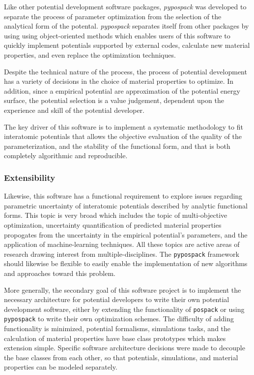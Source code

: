 Like other potential development software packages, \emph{pypospack} was developed to separate the process of parameter optimization from the selection of the analytical form of the potental.  \emph{pypospack} separates itself from other packages by using using object-oriented methods which enables users of this software to quickly implement potentials supported by external codes, calculate new material properties, and even replace the optimization techniques.

Despite the technical nature of the process, the process of potential development has a variety of decisions in the choice of material properties to optimize.  In addition, since a empirical potential are approximation of the potential energy surface, the potential selection is a value judgement, dependent upon the experience and skill of the potential developer.

The key driver of this software is to implement a systematic methodology to fit interatomic potentials that allows the objective evaluation of the quality of the parameterization, and the stability of the functional form, and that is both completely algorithmic and reproducible.

\subsubsection{Extensibility}

Likewise, this software has a functional requirement to explore issues regarding parametric uncertainty of interatomic potentials described by analytic functional forms.
This topic is very broad which includes the topic of multi-objective optimization, uncertainty quantification of predicted material properties propogates from the uncertainty in the empirical potential's parameters, and the application of machine-learning techniques.
All these topics are active areas of research drawing interest from multiple-disciplines.  The \verb|pypospack| framework should likewise be flexible to easily enable the implementation of new algorithms and approaches toward this problem.

More generally, the secondary goal of this software project is to implement the necessary architecture for potential developers to write their own potential development software, either by extending the functionality of \verb|pospack| or using \verb|pypospack| to write their own optimization schemes.  The difficulty of adding functionality is minimized, potential formalisms, simulations tasks, and the calculation of material properties have base class prototypes which makes extension simple.  Specific software architecture decisions were made to decouple the base classes from each other, so that potentials, simulations, and material properties can be modeled separately.

